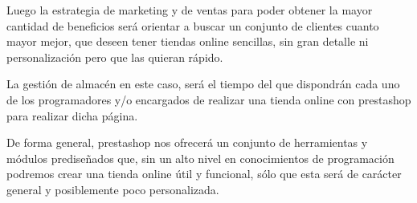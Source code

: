 \documentclass{article}
\begin{document}
Luego la estrategia de marketing y de ventas para poder obtener la mayor cantidad de beneficios será orientar a buscar un conjunto de clientes cuanto mayor mejor, que deseen tener tiendas online sencillas, sin gran detalle ni personalización pero que las quieran rápido.

La gestión de almacén en este caso, será el tiempo del que dispondrán cada uno de los programadores y/o encargados de realizar una tienda online con prestashop para realizar dicha página.

De forma general, prestashop nos ofrecerá un conjunto de herramientas y módulos prediseñados que, sin un alto nivel en conocimientos de programación podremos crear una tienda online útil y funcional, sólo que esta será de carácter general y posiblemente poco personalizada.


\begin{thebibliography}{9}


\end{thebibliography}
\end{document}
